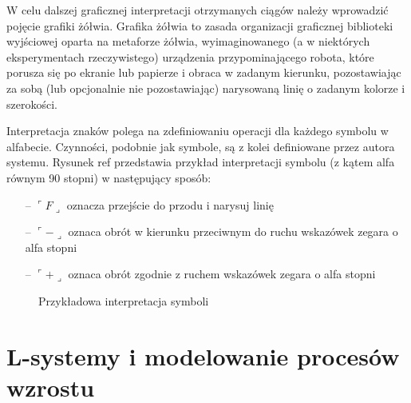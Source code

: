 \documentclass[a4paper,12pt,oneside]{book} %
\def\crnrs#1{$\ulcorner#1\lrcorner$}
\begin{document}
W celu dalszej graficznej interpretacji otrzymanych ciągów
należy wprowadzić pojęcie grafiki żółwia. Grafika żółwia
to zasada organizacji graficznej biblioteki wyjściowej oparta 
na metaforze żółwia, wyimaginowanego 
(a w niektórych eksperymentach rzeczywistego) urządzenia 
przypominającego robota, które porusza się po ekranie 
lub papierze i obraca w zadanym kierunku, 
pozostawiając za sobą (lub opcjonalnie nie pozostawiając) 
narysowaną linię o zadanym kolorze i szerokości.

Interpretacja znaków polega na zdefiniowaniu operacji dla każdego symbolu
w alfabecie. Czynności, podobnie jak symbole, są z kolei definiowane
przez autora systemu. Rysunek ref przedstawia przykład interpretacji
symbolu (z kątem alfa równym 90 stopni) w następujący sposób:

\begin{itemize}
	\item[--] \crnrs{F} oznacza przejście do przodu i narysuj linię
	\item[--] \crnrs{-} oznaca obrót w kierunku przeciwnym do ruchu wskazówek zegara o alfa stopni
	\item[--] \crnrs{+} oznaca obrót zgodnie z ruchem wskazówek zegara o alfa stopni
\end{itemize}

\begin{figure}[h]
	\begin{center}
	\end{center}
	\caption{Przykładowa interpretacja symboli}
	\label{fig:interpret}
\end{figure}

\section{L-systemy i modelowanie procesów wzrostu}
\end{document}
